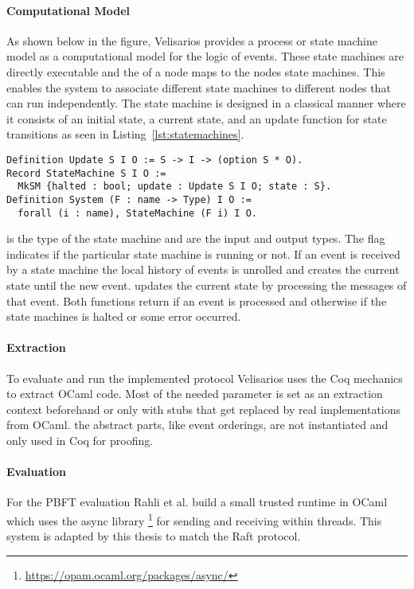 \paragraph{Computational Model}
As shown below in the figure, Velisarios provides a process or state machine
model as a computational model for the logic of events. These state machines
are directly executable and the  of a node maps to the nodes
state machines. This enables the system to associate different state machines
to different nodes that can run independently.
The state machine is designed in a classical manner where
it consists of an initial state, a current state, and an update function
for state transitions as seen in Listing~\ref{lst:statemachines}.

\begin{lstlisting}[style=coq,float,label=lst:statemachines,caption=State
machine definition and update function.]
Definition Update S I O := S -> I -> (option S * O).
Record StateMachine S I O := 
  MkSM {halted : bool; update : Update S I O; state : S}.
Definition System (F : name -> Type) I O :=
  forall (i : name), StateMachine (F i) I O.
\end{lstlisting}

 is the type of the state machine and  are the input
and output types. The  flag indicates if the particular
state machine is running or not. If an event  is received by
a state machine the local history of events is unrolled and
 creates the current state until
the new event.  updates the current
state by processing the messages of that event. Both functions
return  if an event is processed and otherwise
 if the state machines is halted or some error occurred.~\cite{rahli2018velisarios}

\paragraph{Extraction}
To evaluate and run the implemented protocol Velisarios
uses the Coq mechanics to extract OCaml code. Most of
the needed parameter is set as an extraction context beforehand
or only with stubs that get replaced by real implementations from
OCaml. the abstract parts, like event orderings, are not
instantiated and only used in Coq for proofing.~\cite{rahli2018velisarios}

\paragraph{Evaluation}
For the PBFT evaluation Rahli et al. build a small
trusted runtime in OCaml which uses the async library
\footnote{\url{https://opam.ocaml.org/packages/async/}}
for sending and receiving within threads. This system
is adapted by this thesis to match the Raft protocol.


